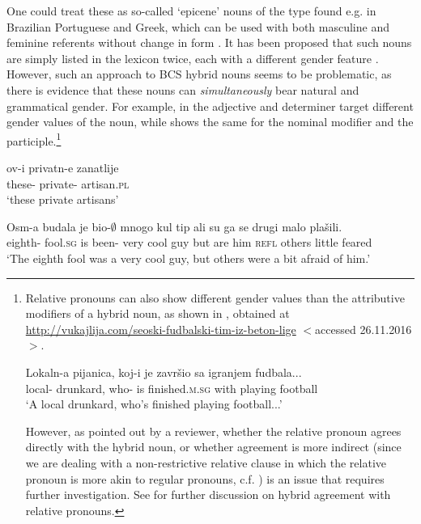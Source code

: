 \documentclass[output=paper,
modfonts,
newtxmath,
hidelinks
]{langscibook}
\begin{document}
\noindent One could treat these as so-called `epicene' nouns of the type found e.g. in Brazilian Portuguese and Greek, which can be used with both masculine and feminine referents without change in form \citep{bobaljikzocca,merchant14,kramerbook}.
 It has been proposed that such nouns are simply listed in the lexicon twice, each with a different gender feature \citep[e.g.][19]{merchant14}. However, such an approach to BCS hybrid nouns seems to be problematic, as there is evidence that these nouns can \textit{simultaneously} bear natural and grammatical gender. 
 For example, in  the adjective and determiner target different gender values of the noun, while  shows the same for the nominal modifier and the participle.\footnote{Relative pronouns can also show different gender values than the attributive modifiers of a hybrid noun, as shown in , obtained at \url{http://vukajlija.com/seoski-fudbalski-tim-iz-beton-lige} $<$accessed 26.11.2016$>$.
 
\ea \gll Lokaln-a pijanica, koj-i je završio sa igranjem fudbala...\\
	local- drunkard, who- is finished.\textsc{m.sg} with playing football\\
	\glt `A local drunkard, who's finished playing football...'\label{14:exfn1i}
    \z

\noindent However, as pointed out by a reviewer, whether the relative pronoun agrees directly with the hybrid noun, or whether agreement is more indirect (since we are dealing with a non-restrictive relative clause in which the relative pronoun is more akin to regular pronouns, c.f. \citealt{devries06}) is an issue that requires further investigation. See \citet{arsenijevicjuksek} for further discussion on hybrid agreement with relative pronouns.}	

	\ea \gll ov-i privatn-e zanatlije\label{14:mismatchbcs}\\
	these- private- artisan.\textsc{pl}\\
	\glt `these private artisans'\hfill \citep[206]{corbett06}\label{14:ex3}
    \z
	
	\ea \gll Osm-a budala je bio-$\emptyset$ mnogo kul tip ali su ga se drugi malo plašili.\footnotemark\\
	eighth- fool.\textsc{sg} is been- very cool guy but are him \textsc{refl} others little feared\\
	\glt `The eighth fool was a very cool guy, but others were a bit afraid of him.'\label{14:ex4}
    \z
 
\end{document}
